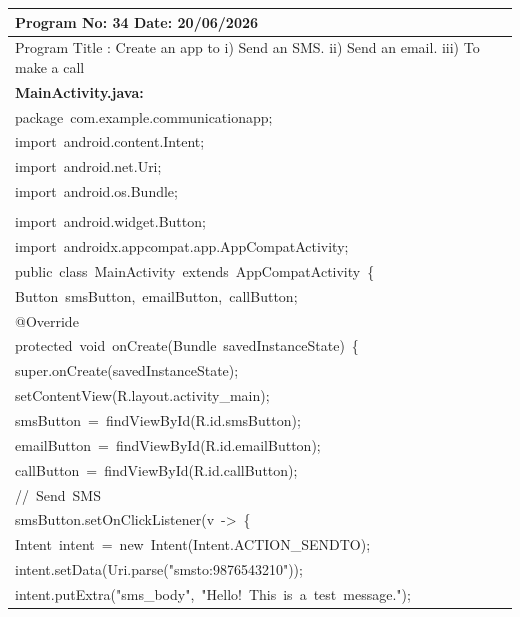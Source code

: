 \documentclass[a4paper,12pt]{article}
\begin{document}
\noindent\begingroup
\renewcommand{\arraystretch}{1.1}
\begin{longtable}{|p{}|}
\hline\endfirsthead\hline\endhead\hline\endfoot\hline\endlastfoot
\rule{0pt}{13pt}Program No: 34 \hfill Date: 20/06/2026 \\
\hline
\rule{0pt}{13pt}Program Title : Create an app to i) Send an SMS. ii) Send an email. iii) To make a call \\
\hline
\rule{0pt}{13pt}\textbf{MainActivity.java:} \\
\hline
{\ttfamily\small package\ com.example.communicationapp;} \\
{\ttfamily\small import\ android.content.Intent;} \\
{\ttfamily\small import\ android.net.Uri;} \\
{\ttfamily\small import\ android.os.Bundle;} \\
\strut \\
{\ttfamily\small import\ android.widget.Button;} \\
{\ttfamily\small import\ androidx.appcompat.app.AppCompatActivity;} \\
{\ttfamily\small public\ class\ MainActivity\ extends\ AppCompatActivity\ \{} \\
{\ttfamily\small Button\ smsButton,\ emailButton,\ callButton;} \\
{\ttfamily\small @Override} \\
{\ttfamily\small protected\ void\ onCreate(Bundle\ savedInstanceState)\ \{} \\
{\ttfamily\small super.onCreate(savedInstanceState);} \\
{\ttfamily\small setContentView(R.layout.activity\_main);} \\
{\ttfamily\small smsButton\ =\ findViewById(R.id.smsButton);} \\
{\ttfamily\small emailButton\ =\ findViewById(R.id.emailButton);} \\
{\ttfamily\small callButton\ =\ findViewById(R.id.callButton);} \\
{\ttfamily\small //\ Send\ SMS} \\
{\ttfamily\small smsButton.setOnClickListener(v\ -\textgreater{}\ \{} \\
{\ttfamily\small Intent\ intent\ =\ new\ Intent(Intent.ACTION\_SENDTO);} \\
{\ttfamily\small intent.setData(Uri.parse("smsto:9876543210"));} \\
{\ttfamily\small intent.putExtra("sms\_body",\ "Hello!\ This\ is\ a\ test\ message.");} \\

\end{longtable}
\end{document}
